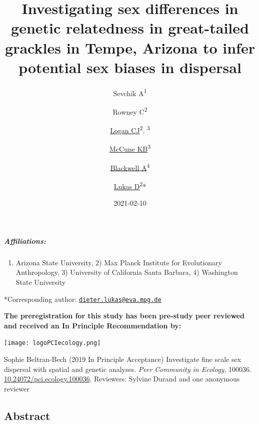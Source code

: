 \documentclass[]{article}
\title{Investigating sex differences in genetic relatedness in great-tailed
grackles in Tempe, Arizona to infer potential sex biases in dispersal}
\author{Sevchik A\textsuperscript{1} \and Rowney C\textsuperscript{2} \and \href{http://CorinaLogan.com}{Logan CJ}\textsuperscript{2},
\textsuperscript{3} \and \href{https://www.kelseymccune.com}{McCune KB}\textsuperscript{3} \and \href{https://blackwell-lab.com}{Blackwell A}\textsuperscript{4} \and \href{http://dieterlukas.strikingly.com}{Lukas D}\textsuperscript{2}*}
\date{2021-02-10}
\providecommand{\tightlist}{%
  \setlength{\itemsep}{0pt}\setlength{\parskip}{0pt}}
\let\oldsubparagraph\subparagraph
\renewcommand{\subparagraph}[1]{\oldsubparagraph{#1}\mbox{}}
\begin{document}
\maketitle

\hypertarget{affiliations}{%
\subparagraph{Affiliations:}\label{affiliations}}

\begin{enumerate}
\def\labelenumi{\arabic{enumi})}
\tightlist
\item
  Arizona State University, 2) Max Planck Institute for Evolutionary
  Anthropology, 3) University of California Santa Barbara, 4) Washington
  State University
\end{enumerate}

*Corresponding author:
\href{mailto:dieter.lukas@eva.mpg.de}{\nolinkurl{dieter.lukas@eva.mpg.de}}

\textbf{The preregistration for this study has been pre-study peer
reviewed and received an In Principle Recommendation by:}

\texttt{[image: logoPCIecology.png]}

Sophie Beltran-Bech (2019 In Principle Acceptance) Investigate fine
scale sex dispersal with spatial and genetic analyses. \emph{Peer
Community in Ecology}, 100036.
\href{https://doi.org/10.24072/pci.ecology.100036}{10.24072/pci.ecology.100036}.
Reviewers: Sylvine Durand and one anonymous reviewer

\hypertarget{abstract}{%
\subsection{Abstract}\label{abstract}}
\end{document}
